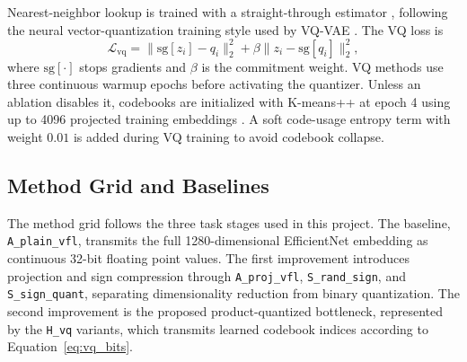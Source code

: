 \documentclass{article}
\begin{document}
Nearest-neighbor lookup is trained with a straight-through estimator \citep{bengio2013estimating}, following the neural vector-quantization training style used by VQ-VAE \citep{oord2017neural}. The VQ loss is
\begin{equation}
    \mathcal{L}_{\mathrm{vq}}
    =
    \lVert \mathrm{sg}[z_i] - q_i \rVert_2^2
    + \beta \lVert z_i - \mathrm{sg}[q_i] \rVert_2^2,
    \label{eq:vq_loss}
\end{equation}
where $\mathrm{sg}[\cdot]$ stops gradients and $\beta$ is the commitment weight. VQ methods use three continuous warmup epochs before activating the quantizer. Unless an ablation disables it, codebooks are initialized with K-means++ at epoch 4 using up to 4096 projected training embeddings \citep{arthur2007kmeans}. A soft code-usage entropy term with weight $0.01$ is added during VQ training to avoid codebook collapse.

\subsection{Method Grid and Baselines}

The method grid follows the three task stages used in this project. The baseline, \texttt{A\_plain\_vfl}, transmits the full 1280-dimensional EfficientNet embedding as continuous 32-bit floating point values. The first improvement introduces projection and sign compression through \texttt{A\_proj\_vfl}, \texttt{S\_rand\_sign}, and \texttt{S\_sign\_quant}, separating dimensionality reduction from binary quantization. The second improvement is the proposed product-quantized bottleneck, represented by the \texttt{H\_vq} variants, which transmits learned codebook indices according to Equation~\ref{eq:vq_bits}.
\end{document}
